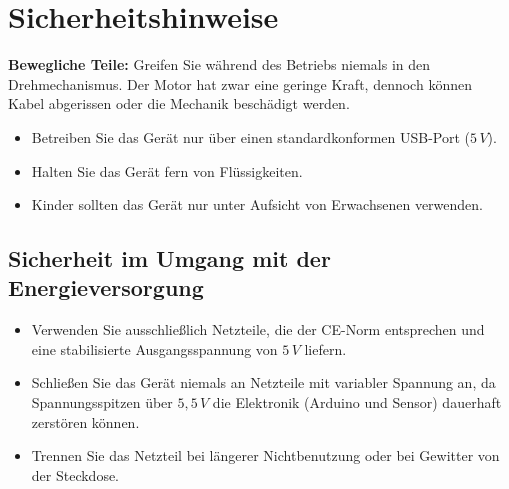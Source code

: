 %
%

\chapter{Sicherheitshinweise}

	\textbf{Bewegliche Teile:} Greifen Sie während des Betriebs niemals in den Drehmechanismus. Der Motor hat zwar eine geringe Kraft, dennoch können Kabel abgerissen oder die Mechanik beschädigt werden.

\begin{itemize}
	\item Betreiben Sie das Gerät nur über einen standardkonformen USB-Port ($5\,V$).
	\item Halten Sie das Gerät fern von Flüssigkeiten.
	\item Kinder sollten das Gerät nur unter Aufsicht von Erwachsenen verwenden.
\end{itemize}

\section{Sicherheit im Umgang mit der Energieversorgung}
\begin{itemize}
	\item Verwenden Sie ausschließlich Netzteile, die der CE-Norm entsprechen und eine stabilisierte Ausgangsspannung von $5\,V$ liefern.
	\item Schließen Sie das Gerät niemals an Netzteile mit variabler Spannung an, da Spannungsspitzen über $5,5\,V$ die Elektronik (Arduino und Sensor) dauerhaft zerstören können.
	\item Trennen Sie das Netzteil bei längerer Nichtbenutzung oder bei Gewitter von der Steckdose.
\end{itemize}





